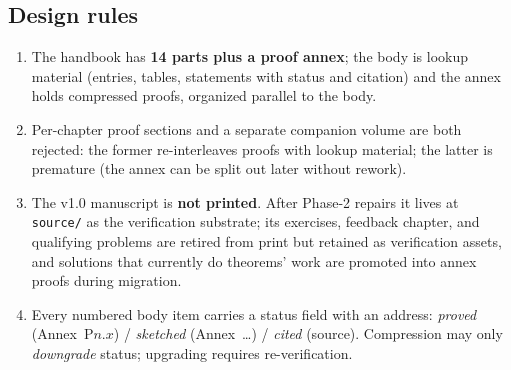 \documentclass[11pt,letterpaper]{article}
\begin{document}
\subsection{Design rules}
\begin{enumerate}
  \item The handbook has \textbf{14 parts plus a proof annex}; the body
        is lookup material (entries, tables, statements with status and
        citation) and the annex holds compressed proofs, organized
        parallel to the body.
  \item Per-chapter proof sections and a separate companion volume are
        both rejected: the former re-interleaves proofs with lookup
        material; the latter is premature (the annex can be split out
        later without rework).
  \item The v1.0 manuscript is \textbf{not printed}.  After Phase-2
        repairs it lives at \texttt{source/} as the verification
        substrate; its exercises, feedback chapter, and qualifying
        problems are retired from print but retained as verification
        assets, and solutions that currently do theorems' work are
        promoted into annex proofs during migration.
  \item Every numbered body item carries a status field with an address:
        \emph{proved} (Annex~P$n$.$x$) / \emph{sketched}
        (Annex~\ldots) / \emph{cited} (source).  Compression may only
        \emph{downgrade} status; upgrading requires re-verification.
\end{enumerate}
\end{document}

